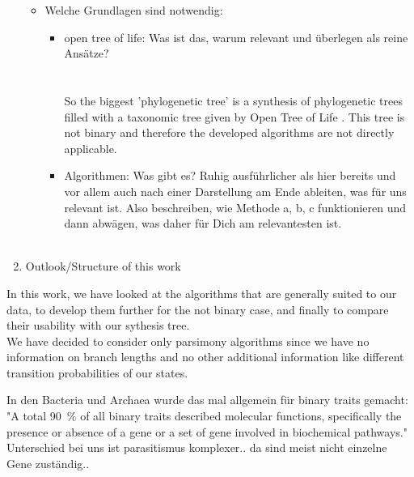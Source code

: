 \begin{enumerate}
\begin{itemize}
        \item Welche Grundlagen sind notwendig:
          \begin{itemize}
            \item open tree of life: Was ist das, warum relevant und überlegen als reine Ansätze? \\
              \todo{!!!} \\ \\
  So the biggest 'phylogenetic tree' is a synthesis 
    of phylogenetic trees filled with a taxonomic tree given by Open Tree of Life \cite{Hinchliff2015}.
    This tree is not binary and therefore the developed algorithms are not directly applicable. \\
            \item Algorithmen: Was gibt es? Ruhig ausführlicher als hier bereits und vor allem auch 
              nach einer Darstellung am Ende ableiten, was für uns relevant ist. Also beschreiben, 
              wie Methode a, b, c funktionieren und dann abwägen, was daher für Dich am 
              relevantesten ist. \\
              \todo{!!!} \\
          \end{itemize}
      \end{itemize}
    \item Outlook/Structure of this work
  \end{enumerate}


  In this work, we have looked at the algorithms that are generally suited to our data, to develop 
  them further for the not binary case, and finally to compare their usability with our sythesis 
  tree. \\
  We have decided to consider only parsimony algorithms since we have no information on branch 
  lengths and no other additional information like different transition probabilities of our states.

  In den Bacteria und Archaea wurde das mal allgemein für binary traits gemacht:
  "A total 90~\% of all binary traits described molecular functions, specifically the presence or absence of a gene or a set of gene involved in biochemical pathways."
  \cite{Goberna2015} \\
  Unterschied bei uns ist parasitismus komplexer.. da sind meist nicht einzelne Gene zuständig..

